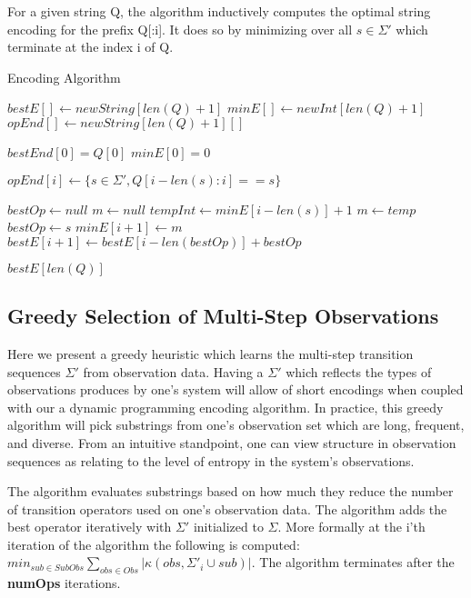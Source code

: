 For a given string Q, the algorithm inductively computes the optimal string encoding for the prefix Q[:i]. It does so by minimizing over all $s \in \Sigma'$ which terminate at the index i of Q.

\begin{algorithm}
\caption{Encoding Algorithm}
\label{Encoding Algorithm}
\begin{algorithmic}[1]

\State $bestE[] \gets new String[len(Q)+1]$
\State $minE[] \gets new Int[len(Q)+1]$
\State $opEnd[] \gets new String[len(Q)+1][]$

\State $bestEnd[0] = Q[0]$
\State $minE[0] = 0$

	 \State $opEnd[i] \gets \{s \in \Sigma', Q[i-len(s):i] == s\}$
\EndFor

	\State $bestOp \gets null$
	\State $m \gets null$ 
		\State $tempInt \gets minE[i-len(s)] + 1$
			\State $m \gets temp$ 
			\State $bestOp \gets s$
		\EndIf
	\EndFor
	\State $minE[i+1] \gets m$
	\State $bestE[i+1] \gets bestE[i-len(bestOp)] + bestOp$
\EndFor

\Return $bestE[len(Q)]$

\EndProcedure
\end{algorithmic}
\end{algorithm}

\subsection{Greedy Selection of Multi-Step Observations}

Here we present a greedy heuristic which learns the multi-step transition sequences $\Sigma'$ from observation data. Having a $\Sigma'$ which reflects the types of observations produces by one's system will allow of short encodings when coupled with our a dynamic programming encoding algorithm. In practice, this greedy algorithm will pick substrings from one's observation set which are long, frequent, and diverse. From an intuitive standpoint, one can view structure in observation sequences as relating to the level of entropy in the system's observations. 

The algorithm evaluates substrings based on how much they reduce the number of transition operators used on one's observation data. The algorithm adds the best operator iteratively with $\Sigma'$ initialized to $\Sigma$. More formally at the i'th iteration of the algorithm the following is computed: $min_{sub \in SubObs} \sum\nolimits_{obs \in Obs}|\kappa(obs,\Sigma'_i \cup sub)|$. The algorithm terminates after the \textbf{numOps} iterations. 


